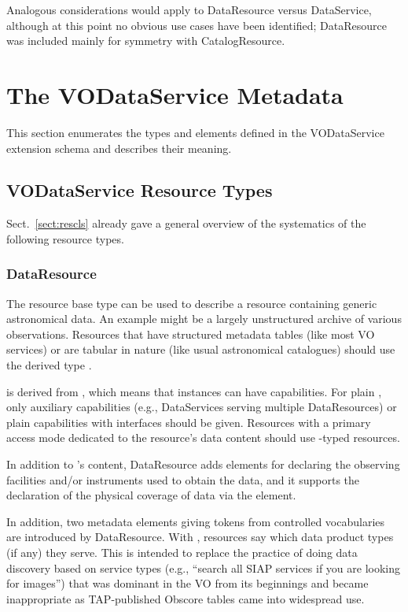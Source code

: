 \documentclass[11pt,a4paper]{ivoa}
\begin{document}
Analogous considerations would apply to DataResource versus DataService,
although at this point no obvious use cases have been identified;
DataResource was included mainly for symmetry with CatalogResource.

\section{The VODataService Metadata}
\label{sect:metadata}


This section enumerates the types and elements defined in the
VODataService extension schema and describes their meaning.


\subsection{VODataService Resource Types}
\label{sect:resext}

Sect.~\ref{sect:rescls} already gave a general overview of the
systematics of the following resource types.

\subsubsection{DataResource}
\label{sect:DataResource}

The  resource base type can be used to describe a
resource containing generic astronomical data.
An example might be a largely unstructured archive
of various observations.  Resources that have structured metadata tables
(like most VO services) or are tabular in nature (like usual
astronomical catalogues) should use the derived type .

 is derived from , which means
that instances can have
capabilities.  For plain , only auxiliary capabilities
(e.g., DataServices serving multiple DataResources) or plain capabilities
with  interfaces should be given.  Resources with a
primary access mode dedicated to the resource's data content should use
-typed resources.

In addition to 's content, DataResource adds
elements for declaring the observing facilities and/or instruments used
to obtain the data, and it supports the declaration of
the physical coverage of data via the 
element.

In addition, two metadata elements giving tokens from controlled
vocabularies are introduced by DataResource.  With
, resources say which data product types (if
any) they serve.  This is intended to replace the practice of doing data
discovery based on service types (e.g., ``search all SIAP services if
you are looking for images'') that was dominant in the VO from its
beginnings and became inappropriate as TAP-published Obscore tables
\citep{2017ivoa.spec.0509L} came into widespread use.
\end{document}
